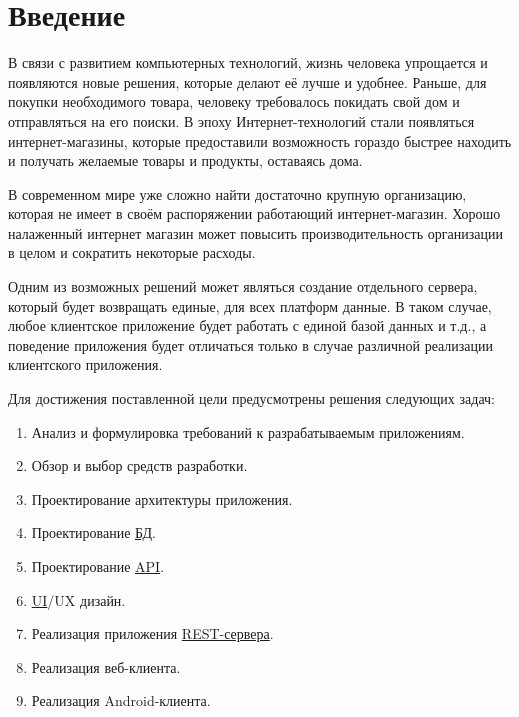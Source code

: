 \label{sec:intro}
\section*{Введение}\indent

В связи с развитием компьютерных технологий, жизнь человека упрощается и появляются новые решения, которые делают её лучше и удобнее. 
Раньше, для покупки необходимого товара, человеку требовалось покидать свой дом и отправляться на его поиски.
В эпоху Интернет-технологий стали появляться интернет-магазины, которые предоставили возможность гораздо быстрее находить и получать желаемые товары и продукты, оставаясь дома.

В современном мире уже сложно найти достаточно крупную организацию, которая не имеет в своём распоряжении работающий интернет-магазин.
Хорошо налаженный интернет магазин может повысить производительность организации в целом и сократить некоторые расходы.

Одним из возможных решений может являться создание отдельного сервера, который будет возвращать единые, для всех платформ данные. 
В таком случае, любое клиентское приложение будет работать с единой базой данных и т.д., а поведение приложения будет отличаться только в случае различной реализации клиентского приложения.

Для достижения поставленной цели предусмотрены решения следующих задач:
\begin{enumerate}
    \item Анализ и формулировка требований к разрабатываемым приложениям.
    \item Обзор и выбор средств разработки.
    \item Проектирование архитектуры приложения.
    \item Проектирование \hyperlink{gloss:db}{БД}.
    \item Проектирование \hyperlink{gloss:api}{API}.
    \item \hyperlink{gloss:ui}{UI}/UX дизайн.
    \item Реализация приложения \hyperlink{gloss:rest}{REST-сервера}.
    \item Реализация веб-клиента.
    \item Реализация Android-клиента.
\end{enumerate}